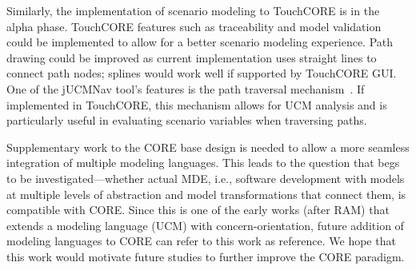 Similarly, the implementation of scenario modeling to TouchCORE is in the alpha phase. TouchCORE features such as traceability and model validation could be implemented to allow for a better scenario modeling experience. Path drawing could be improved as current implementation uses straight lines to connect path nodes; splines would work well if supported by TouchCORE GUI. One of the jUCMNav tool's features is the path traversal mechanism~\cite{kealey2007enhanced2}. If implemented in TouchCORE, this mechanism allows for UCM analysis and is particularly useful in evaluating scenario variables when traversing paths.

Supplementary work to the CORE base design is needed to allow a more seamless integration of multiple modeling languages. This leads to the question that begs to be investigated---whether actual MDE, i.e., software development with models at multiple levels of abstraction and model transformations that connect them, is compatible with CORE. Since this is one of the early works (after RAM) that extends a modeling language (UCM) with concern-orientation, future addition of modeling languages to CORE can refer to this work as reference. We hope that this work would motivate future studies to further improve the CORE paradigm.
